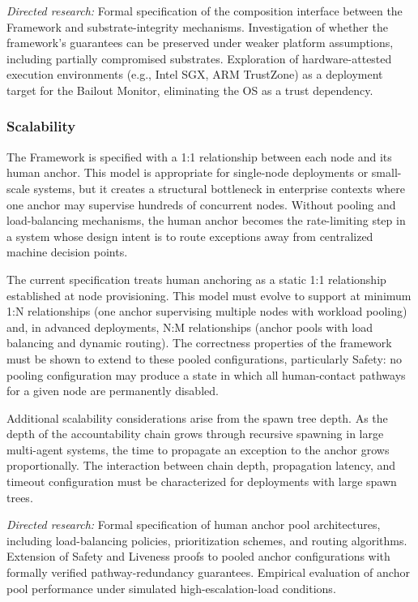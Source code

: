 \textit{Directed research:} Formal specification of the composition interface
between the \bxthree{} Framework and substrate-integrity mechanisms.
Investigation of whether the framework's guarantees can be preserved under
weaker platform assumptions, including partially compromised substrates.
Exploration of hardware-attested execution environments (e.g., Intel SGX,
ARM TrustZone) as a deployment target for the Bailout Monitor, eliminating
the OS as a trust dependency.

\subsubsection{Scalability}\label{sec:scalability}

The \bxthree{} Framework is specified with a 1:1 relationship between each node
and its human anchor.  This model is appropriate for single-node deployments or
small-scale systems, but it creates a structural bottleneck in enterprise
contexts where one anchor may supervise hundreds of concurrent nodes.  Without
pooling and load-balancing mechanisms, the human anchor becomes the
rate-limiting step in a system whose design intent is to route exceptions away
from centralized machine decision points.

The current specification treats human anchoring as a static 1:1 relationship
established at node provisioning.  This model must evolve to support at minimum
1:N relationships (one anchor supervising multiple nodes with workload pooling)
and, in advanced deployments, N:M relationships (anchor pools with load
balancing and dynamic routing).  The correctness properties of the framework
must be shown to extend to these pooled configurations, particularly Safety:
no pooling configuration may produce a state in which all human-contact
pathways for a given node are permanently disabled.

Additional scalability considerations arise from the spawn tree depth.  As the
depth of the accountability chain grows through recursive spawning in large
multi-agent systems, the time to propagate an exception to the anchor grows
proportionally.  The interaction between chain depth, propagation latency,
and timeout configuration must be characterized for deployments with large
spawn trees.

\textit{Directed research:} Formal specification of human anchor pool
architectures, including load-balancing policies, prioritization schemes, and
routing algorithms.  Extension of Safety and Liveness proofs to pooled anchor
configurations with formally verified pathway-redundancy guarantees.
Empirical evaluation of anchor pool performance under simulated
high-escalation-load conditions.

